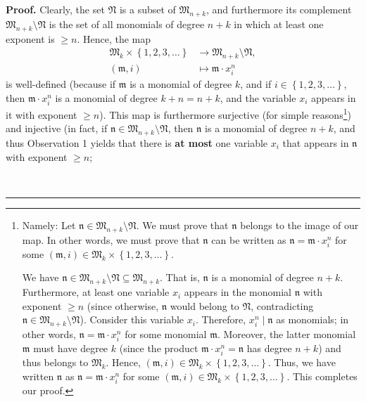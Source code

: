 \documentclass[numbers=enddot,12pt,final,onecolumn,notitlepage]{scrartcl}%
\theoremstyle{definition}
\newenvironment{proof}[1][Proof]{\noindent\textbf{#1.} }{\ \rule{0.5em}{0.5em}}
\begin{document}
\begin{proof}
Clearly, the set $\mathfrak{N}$ is a subset of $\mathfrak{M}_{n+k}$, and
furthermore its complement $\mathfrak{M}_{n+k}\setminus\mathfrak{N}$ is the
set of all monomials of degree $n+k$ in which at least one exponent is $\geq
n$. Hence, the map%
\begin{align*}
\mathfrak{M}_{k}\times\left\{  1,2,3,\ldots\right\}   &  \rightarrow
\mathfrak{M}_{n+k}\setminus\mathfrak{N},\\
\left(  \mathfrak{m},i\right)   &  \mapsto\mathfrak{m}\cdot x_{i}^{n}%
\end{align*}
is well-defined (because if $\mathfrak{m}$ is a monomial of degree $k$, and if
$i\in\left\{  1,2,3,\ldots\right\}  $, then $\mathfrak{m}\cdot x_{i}^{n}$ is a
monomial of degree $k+n=n+k$, and the variable $x_{i}$ appears in it with
exponent $\geq n$). This map is furthermore surjective (for simple
reasons\footnote{Namely: Let $\mathfrak{n}\in\mathfrak{M}_{n+k}\setminus
\mathfrak{N}$. We must prove that $\mathfrak{n}$ belongs to the image of our
map. In other words, we must prove that $\mathfrak{n}$ can be written as
$\mathfrak{n}=\mathfrak{m}\cdot x_{i}^{n}$ for some $\left(  \mathfrak{m}%
,i\right)  \in\mathfrak{M}_{k}\times\left\{  1,2,3,\ldots\right\}  $.
\par
We have $\mathfrak{n}\in\mathfrak{M}_{n+k}\setminus\mathfrak{N}\subseteq
\mathfrak{M}_{n+k}$. That is, $\mathfrak{n}$ is a monomial of degree $n+k$.
Furthermore, at least one variable $x_{i}$ appears in the monomial
$\mathfrak{n}$ with exponent $\geq n$ (since otherwise, $\mathfrak{n}$ would
belong to $\mathfrak{N}$, contradicting $\mathfrak{n}\in\mathfrak{M}%
_{n+k}\setminus\mathfrak{N}$). Consider this variable $x_{i}$. Therefore,
$x_{i}^{n}\mid\mathfrak{n}$ as monomials; in other words, $\mathfrak{n}%
=\mathfrak{m}\cdot x_{i}^{n}$ for some monomial $\mathfrak{m}$. Moreover, the
latter monomial $\mathfrak{m}$ must have degree $k$ (since the product
$\mathfrak{m}\cdot x_{i}^{n}=\mathfrak{n}$ has degree $n+k$) and thus belongs
to $\mathfrak{M}_{k}$. Hence, $\left(  \mathfrak{m},i\right)  \in
\mathfrak{M}_{k}\times\left\{  1,2,3,\ldots\right\}  $. Thus, we have written
$\mathfrak{n}$ as $\mathfrak{n}=\mathfrak{m}\cdot x_{i}^{n}$ for some $\left(
\mathfrak{m},i\right)  \in\mathfrak{M}_{k}\times\left\{  1,2,3,\ldots\right\}
$. This completes our proof.}) and injective (in fact, if $\mathfrak{n}%
\in\mathfrak{M}_{n+k}\setminus\mathfrak{N}$, then $\mathfrak{n}$ is a monomial
of degree $n+k$, and thus Observation 1 yields that there is \textbf{at most}
one variable $x_{i}$ that appears in $\mathfrak{n}$ with exponent $\geq n$;

\end{proof}
\end{document}
